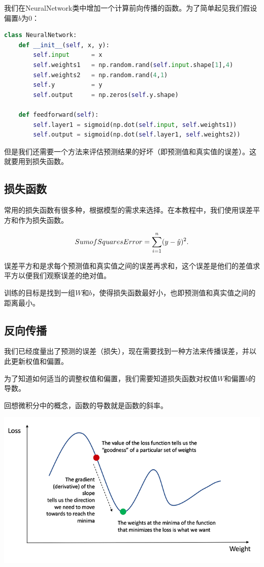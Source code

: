 我们在NeuralNetwork类中增加一个计算前向传播的函数。为了简单起见我们假设偏置$b$为$0$：

\begin{lstlisting}[language=python, breaklines]
class NeuralNetwork:
    def __init__(self, x, y):
        self.input      = x
        self.weights1   = np.random.rand(self.input.shape[1],4) 
        self.weights2   = np.random.rand(4,1)                 
        self.y          = y
        self.output     = np.zeros(self.y.shape)

    def feedforward(self):
        self.layer1 = sigmoid(np.dot(self.input, self.weights1))
        self.output = sigmoid(np.dot(self.layer1, self.weights2))
\end{lstlisting}

但是我们还需要一个方法来评估预测结果的好坏（即预测值和真实值的误差）。这就要用到损失函数。

\subsection{损失函数}

常用的损失函数有很多种，根据模型的需求来选择。在本教程中，我们使用误差平方和作为损失函数。

\begin{equation}
    Sum\-of\-Squares Error = \sum_{i=1}^{n}(y-\hat{y})^2.
\end{equation}

误差平方和是求每个预测值和真实值之间的误差再求和，这个误差是他们的差值求平方以便我们观察误差的绝对值。

训练的目标是找到一组$W$和$b$，使得损失函数最好小，也即预测值和真实值之间的距离最小。

\subsection{反向传播}

我们已经度量出了预测的误差（损失），现在需要找到一种方法来传播误差，并以此更新权值和偏置。

为了知道如何适当的调整权值和偏置，我们需要知道损失函数对权值$W$和偏置$b$的导数。

回想微积分中的概念，函数的导数就是函数的斜率。

\noindent\includegraphics[width=\textwidth]{3.png}

